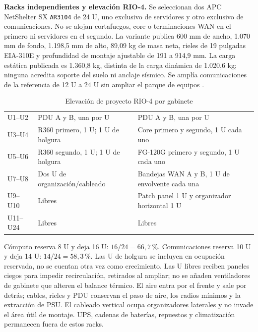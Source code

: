 \textbf{Racks independientes y elevación RIO-4.}\label{sec:sd4-racks-rio4}
Se seleccionan dos APC NetShelter SX \texttt{AR3104} de 24 U, uno exclusivo de servidores y otro exclusivo de comunicaciones. No se alojan cortafuegos, core o terminaciones WAN en el primero ni servidores en el segundo. La variante publica 600 mm de ancho, 1.070 mm de fondo, 1.198,5 mm de alto, 89,09 kg de masa neta, rieles de 19 pulgadas EIA-310E y profundidad de montaje ajustable de 191 a 914,9 mm. La carga estática publicada es 1.360,8 kg, distinta de la carga dinámica de 1.020,6 kg; ninguna acredita soporte del suelo ni anclaje sísmico. Se amplía comunicaciones de la referencia de 12 U a 24 U sin ampliar el parque de equipos \parencites{p12-apc-ar3104}[RT-06.05, p.~15]{pucv-transversal}.

\begin{table}[htbp]
\centering\small
\caption{Elevación de proyecto RIO-4 por gabinete}\label{tab:sd4-rio4}
\begin{tabularx}{\linewidth}{L{18mm}X X}
\hline
{} &  &  \\ \hline
U1--U2 & PDU A y B, una por U & PDU A y B, una por U \\ \hline
U3--U4 & R360 primero, 1 U; 1 U de holgura & Core primero y segundo, 1 U cada uno \\ \hline
U5--U6 & R360 segundo, 1 U; 1 U de holgura & FG-120G primero y segundo, 1 U cada uno \\ \hline
U7--U8 & Dos U de organización/cableado & Bandejas WAN A y B, 1 U de envolvente cada una \\ \hline
U9--U10 & Libres & Patch panel 1 U y organizador horizontal 1 U \\ \hline
U11--U24 & Libres & Libres \\ \hline
\end{tabularx}
\end{table}

Cómputo reserva 8 U y deja 16 U: $16/24=66,7\,\%$. Comunicaciones reserva 10 U y deja 14 U: $14/24=58,3\,\%$. Las U de holgura se incluyen en ocupación reservada, no se cuentan otra vez como crecimiento. Las U libres reciben paneles ciegos para impedir recirculación, retirados al ampliar; no se añaden ventiladores de gabinete que alteren el balance térmico. El aire entra por el frente y sale por detrás; cables, rieles y PDU conservan el paso de aire, los radios mínimos y la extracción de PSU. El cableado vertical ocupa organizadores laterales y no invade el área útil de montaje. UPS, cadenas de baterías, repuestos y climatización permanecen fuera de estos racks.

